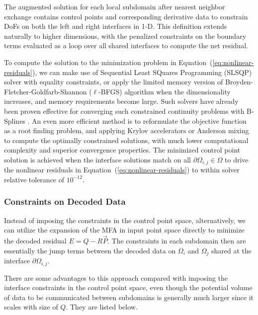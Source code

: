 \documentclass[conference]{IEEEtran}
\newcommand{\eqt}[1]{Equation~(\ref{#1})}
\begin{document}
The augmented solution for each local subdomain after nearest neighbor exchange contains control points and corresponding derivative data to constrain DoFs on both the left and right interfaces in 1-D. This definition extends naturally to higher dimensions, with the penalized constraints on the boundary terms evaluated as a loop over all shared interfaces to compute the net residual. 

To compute the solution to the minimization problem in \eqt{eq:nonlinear-residuals}, we can make use of Sequential Least SQuares Programming (SLSQP) solver with equality constraints, or apply the limited memory version of  Broyden-Fletcher-Goldfarb-Shannon ($\ell$-BFGS) algorithm when the dimensionality increases, and memory requirements become large. Such solvers have already been proven effective for converging such constrained continuity problems with B-Splines \cite{zheng-bo-bspline-bfgs}. An even more efficient method is to reformulate the objective function as a root finding problem, and applying Krylov accelerators or Anderson mixing to compute the optimally constrained solutions, with much lower computational complexity and superior convergence properties. The minimized control point solution is achieved when the interface solutions match on all $\partial \Omega_{i,j} \in \Omega$ to drive the nonlinear residuals in \eqt{eq:nonlinear-residuals} to within solver relative tolerance of $10^{-12}$.


\subsubsection*{Constraints on Decoded Data}

Instead of imposing the constraints in the control point space, alternatively, we can utilize the expansion of the MFA in input point space directly to minimize the decoded residual $E= Q - R \vec{P}$. The constraints in each subdomain then are essentially the jump terms between the decoded data on $\Omega_i$ and $\Omega_j$ shared at the interface $\partial \Omega_{i,j}$.

There are some advantages to this approach compared with imposing the interface constraints in the control point space, even though the potential volume of data to be communicated between subdomains is generally much larger since it scales with size of $Q$. They are listed below.
\end{document}
